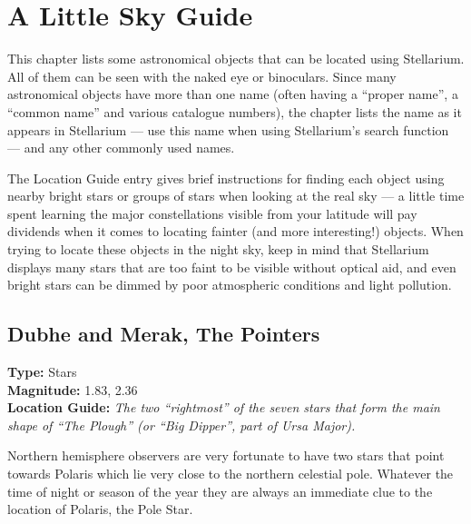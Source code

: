 %

\chapter{A Little Sky Guide}
\label{ch:SkyGuide}

This chapter lists some astronomical objects that can be located using
Stellarium. All of them can be seen with the naked eye or binoculars.
Since many astronomical objects have more than one name (often having
a ``proper name'', a ``common name'' and various catalogue numbers),
the chapter lists the name as it appears in Stellarium --- use this
name when using Stellarium's search function --- and any other
commonly used names.

The Location Guide entry gives brief instructions for finding each
object using nearby bright stars or groups of stars when looking at the
real sky --- a little time spent learning the major constellations
visible from your latitude will pay dividends when it comes to locating
fainter (and more interesting!) objects. When trying to locate these
objects in the night sky, keep in mind that Stellarium displays many
stars that are too faint to be visible without optical aid, and even
bright stars can be dimmed by poor atmospheric conditions and light
pollution.

\section{Dubhe and Merak, The Pointers}
\textbf{Type:} Stars \\
\textbf{Magnitude:} 1.83, 2.36 \\
\textbf{Location Guide:} \textit{The two ``rightmost'' of the seven stars that form the main shape of ``The Plough'' (or ``Big Dipper'', part of Ursa Major).} 

Northern hemisphere observers are very fortunate to have two stars
that point towards Polaris which lie very close to the northern
celestial pole. Whatever the time of night or season of the year they
are always an immediate clue to the location of Polaris, the Pole
Star.

